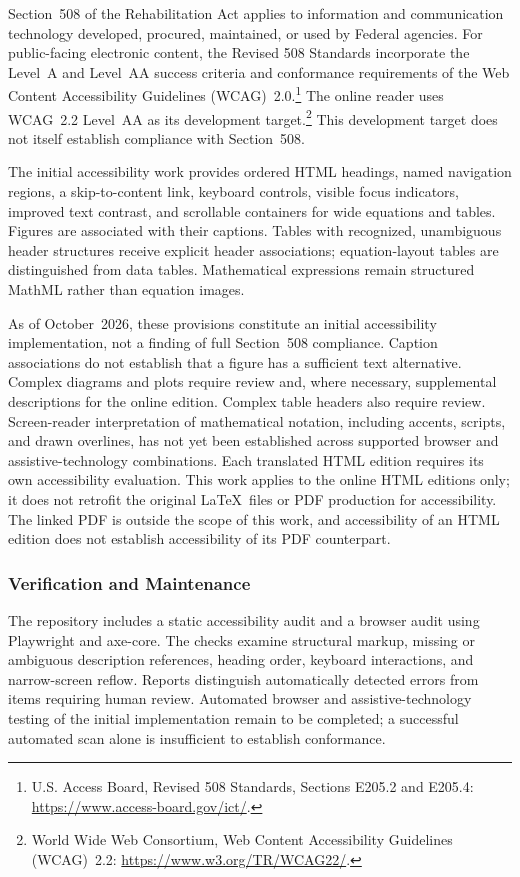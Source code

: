 \documentclass[11pt]{book}
\begin{document}
Section~508 of the Rehabilitation Act applies to information and communication technology developed, procured, maintained, or used by Federal agencies. For public-facing electronic content, the Revised 508 Standards incorporate the Level~A and Level~AA success criteria and conformance requirements of the Web Content Accessibility Guidelines (WCAG)~2.0.\footnote{U.S. Access Board, Revised 508 Standards, Sections E205.2 and E205.4: \url{https://www.access-board.gov/ict/}.} The online reader uses WCAG~2.2 Level~AA as its development target.\footnote{World Wide Web Consortium, Web Content Accessibility Guidelines (WCAG)~2.2: \url{https://www.w3.org/TR/WCAG22/}.} This development target does not itself establish compliance with Section~508.

The initial accessibility work provides ordered HTML headings, named navigation regions, a skip-to-content link, keyboard controls, visible focus indicators, improved text contrast, and scrollable containers for wide equations and tables. Figures are associated with their captions. Tables with recognized, unambiguous header structures receive explicit header associations; equation-layout tables are distinguished from data tables. Mathematical expressions remain structured MathML rather than equation images.

As of October~2026, these provisions constitute an initial accessibility implementation, not a finding of full Section~508 compliance. Caption associations do not establish that a figure has a sufficient text alternative. Complex diagrams and plots require review and, where necessary, supplemental descriptions for the online edition. Complex table headers also require review. Screen-reader interpretation of mathematical notation, including accents, scripts, and drawn overlines, has not yet been established across supported browser and assistive-technology combinations. Each translated HTML edition requires its own accessibility evaluation. This work applies to the online HTML editions only; it does not retrofit the original \LaTeX\ files or PDF production for accessibility. The linked PDF is outside the scope of this work, and accessibility of an HTML edition does not establish accessibility of its PDF counterpart.

\subsubsection{Verification and Maintenance}

The repository includes a static accessibility audit and a browser audit using Playwright and axe-core. The checks examine structural markup, missing or ambiguous description references, heading order, keyboard interactions, and narrow-screen reflow. Reports distinguish automatically detected errors from items requiring human review. Automated browser and assistive-technology testing of the initial implementation remain to be completed; a successful automated scan alone is insufficient to establish conformance.
\end{document}
